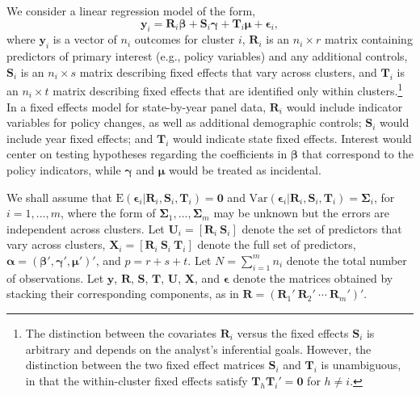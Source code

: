 \documentclass[12pt]{article}\usepackage[]{graphicx}\usepackage[]{color}
\newcommand{\E}{\text{E}}
\newcommand{\Var}{\text{Var}}
\newcommand{\bm}{\mathbf}
\newcommand{\bs}{\boldsymbol}
\begin{document}
We consider a linear regression model of the form,
\begin{equation}
\label{eq:fixed_effects}
\bm{y}_i = \bm{R}_i \bs\beta + \bm{S}_i \bs\gamma + \bm{T}_i \bs\mu + \bs\epsilon_i,
\end{equation}
where $\bm{y}_i$ is a vector of $n_i$ outcomes for cluster $i$,  $\bm{R}_i$ is an $n_i \times r$ matrix containing predictors of primary interest (e.g., policy variables) and any additional controls, $\bm{S}_i$ is an $n_i \times s$ matrix describing fixed effects that vary across clusters, and $\bm{T}_i$ is an $n_i \times t$ matrix describing fixed effects that are identified only within clusters.\footnote{The distinction between the covariates $\bm{R}_i$ versus the fixed effects $\bm{S}_i$ is arbitrary and depends on the analyst's inferential goals. However, the distinction between the two fixed effect matrices $\bm{S}_i$ and $\bm{T}_i$ is unambiguous, in that the within-cluster fixed effects satisfy $\bm{T}_h \bm{T}_i' = \bm{0}$ for $h \neq i$.}
In a fixed effects model for state-by-year panel data, $\bm{R}_i$ would include indicator variables for policy changes, as well as additional demographic controls; $\bm{S}_i$ would include year fixed effects; and $\bm{T}_i$ would indicate state fixed effects. 
Interest would center on testing hypotheses regarding the coefficients in $\bs\beta$ that correspond to the policy indicators, while $\bs\gamma$ and $\bs\mu$ would be treated as incidental. 

We shall assume that $\E\left(\bs\epsilon_i\left|\bm{R}_i,\bm{S}_i, \bm{T}_i\right.\right) = \bm{0}$ and $\Var\left(\bs\epsilon_i\left|\bm{R}_i,\bm{S}_i,\bm{T}_i\right.\right) = \bs\Sigma_i$, for $i = 1,...,m$, where the form of $\bs\Sigma_1,...,\bs\Sigma_m$ may be unknown but the errors are independent across clusters. 
Let $\bm{U}_i = \left[\bm{R}_i \ \bm{S}_i \right]$ denote the set of predictors that vary across clusters, $\bm{X}_i = \left[\bm{R}_i \ \bm{S}_i \ \bm{T}_i \right]$ denote the full set of predictors, $\bs\alpha = \left(\bs\beta', \bs\gamma', \bs\mu' \right)'$, and $p = r + s + t$.
Let $N = \sum_{i=1}^m n_i$ denote the total number of observations.
Let $\bm{y}$, $\bm{R}$, $\bm{S}$, $\bm{T}$, $\bm{U}$, $\bm{X}$, and $\bs\epsilon$ denote the matrices obtained by stacking their corresponding components, as in $\bm{R} = \left(\bm{R}_1' \ \bm{R}_2' \ \cdots \ \bm{R}_m'\right)'$. 
\end{document}

